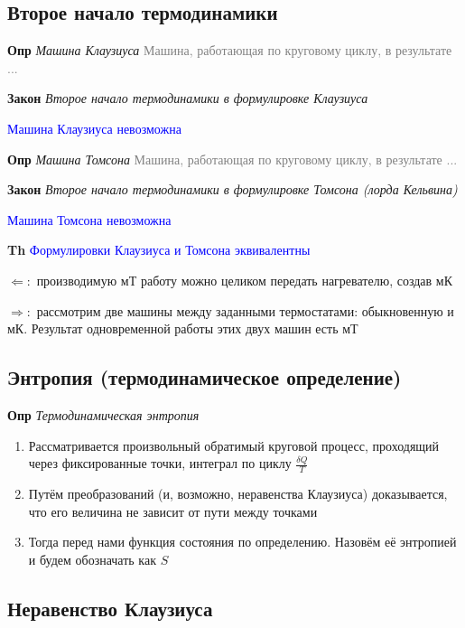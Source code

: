 \documentclass[a4paper, 14pt]{article}
\begin{document}
    \subsection{Второе начало термодинамики}

    \textbf{Опр} \textit{Машина Клаузиуса} \textcolor{gray}{Машина, работающая по круговому циклу, в результате ...}

    \textbf{Закон} \textit{Второе начало термодинамики в формулировке Клаузиуса}

    \textcolor{blue}{Машина Клаузиуса невозможна}

    \textbf{Опр} \textit{Машина Томсона} \textcolor{gray}{Машина, работающая по круговому циклу, в результате ...}

    \textbf{Закон} \textit{Второе начало термодинамики в формулировке Томсона (лорда Кельвина)}

    \textcolor{blue}{Машина Томсона невозможна}

    \textbf{Th} \textcolor{blue}{Формулировки Клаузиуса и Томсона эквивалентны}

    $\Leftarrow:$ производимую мТ работу можно целиком передать нагревателю, создав мК

    $\Rightarrow:$ рассмотрим две машины между заданными термостатами: обыкновенную и мК.
    Результат одновременной работы этих двух машин есть мТ

    \subsection{Энтропия (термодинамическое определение)}

    \textbf{Опр} \textit{Термодинамическая энтропия}

    \begin{enumerate}
        \item Рассматривается произвольный обратимый круговой процесс, проходящий через фиксированные точки, интеграл
        по циклу $\frac{\delta Q}{T}$
        \item Путём преобразований (и, возможно, неравенства Клаузиуса) доказывается, что его величина не зависит от
        пути между точками
        \item Тогда перед нами функция состояния по определению.
        Назовём её энтропией и будем обозначать как $S$
    \end{enumerate}

    \subsection{Неравенство Клаузиуса}
\end{document}
